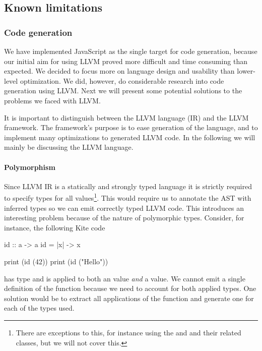 
\subsection{Known limitations}

\subsubsection{Code generation}
We have implemented JavaScript as the single target for code generation, because our initial aim for using LLVM proved more difficult and time consuming than expected. We decided to focus more on language design and usability than lower-level optimization. We did, however, do considerable research into code generation using LLVM. Next we will present some potential solutions to the problems we faced with LLVM.

It is important to distinguish between the LLVM language (IR) and the LLVM framework. The framework's purpose is to ease generation of the language, and to implement many optimizations to generated LLVM code. In the following we will mainly be discussing the LLVM language.

\paragraph{Polymorphism}
Since LLVM IR is a statically and strongly typed language it is strictly required to specify types for all values\footnote{There are exceptions to this, for instance using the  and  and their related classes, but we will not cover this.}. This would require us to annotate the AST with inferred types so we can emit correctly typed LLVM code. This introduces an interesting problem because of the nature of polymorphic types. Consider, for instance, the following Kite code

\begin{kite}
id :: a -> a
id = |x| -> { x }

print (id (42))
print (id ("Hello"))
\end{kite}

 has type  and is applied to both an  value \emph{and} a \code{[Char]} value. We cannot emit a single definition of the function because we need to account for both applied types. One solution would be to extract all applications of the function and generate one for each of the types used.

